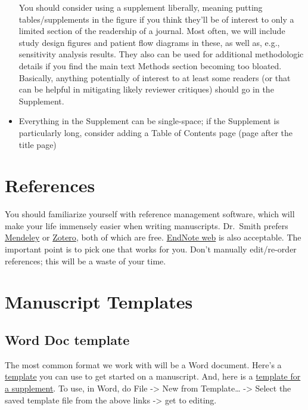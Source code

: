 \documentclass[
  letterpaper,
  DIV=11,
  numbers=noendperiod]{scrreprt}
\begin{document}
\begin{itemize}
  You should consider using a supplement liberally, meaning putting
  tables/supplements in the figure if you think they'll be of interest
  to only a limited section of the readership of a journal. Most often,
  we will include study design figures and patient flow diagrams in
  these, as well as, e.g., sensitivity analysis results. They also can
  be used for additional methodologic details if you find the main text
  Methods section becoming too bloated. Basically, anything potentially
  of interest to at least some readers (or that can be helpful in
  mitigating likely reviewer critiques) should go in the Supplement.
\item
  Everything in the Supplement can be single-space; if the Supplement is
  particularly long, consider adding a Table of Contents page (page
  after the title page)
\end{itemize}

\hypertarget{references-1}{%
\section{References}\label{references-1}}

You should familiarize yourself with reference management software,
which will make your life immensely easier when writing manuscripts.
Dr.~Smith prefers \href{https://www.mendeley.com/}{Mendeley} or
\href{https://www.zotero.org/}{Zotero}, both of which are free.
\href{https://www.myendnoteweb.com/}{EndNote web} is also acceptable.
The important point is to pick one that works for you. Don't manually
edit/re-order references; this will be a waste of your time.

\hypertarget{manuscript-templates}{%
\section{Manuscript Templates}\label{manuscript-templates}}

\hypertarget{word-doc-template}{%
\subsection{Word Doc template}\label{word-doc-template}}

The most common format we work with will be a Word document. Here's a
\href{/assets/templates/papers/word_paper_template.dotx}{template} you
can use to get started on a manuscript. And, here is a
\href{/assets/templates/papers/word_supplement_template.dotx}{template
for a supplement}. To use, in Word, do File -\textgreater{} New from
Template\ldots{} -\textgreater{} Select the saved template file from the
above links -\textgreater{} get to editing.
\end{document}
